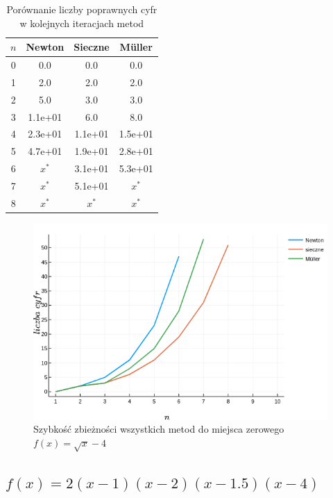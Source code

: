 \documentclass[12pt]{article}
\begin{document}
\begin{table}[H]
\centering
\begin{tabular}{|c|c|c|c|}
    \hline
    $n$ & Newton & Sieczne & Müller   \\ \hline\hline
    0  & 0.0     & 0.0     &  0.0     \\ \hline
    1  & 2.0     & 2.0     &  2.0     \\ \hline
    2  & 5.0     & 3.0     &  3.0     \\ \hline
    3  & 1.1e+01 & 6.0     &  8.0     \\ \hline
    4  & 2.3e+01 & 1.1e+01 &  1.5e+01 \\ \hline
    5  & 4.7e+01 & 1.9e+01 &  2.8e+01 \\ \hline
    6  & $x^*$   & 3.1e+01 &  5.3e+01 \\ \hline
    7  & $x^*$   & 5.1e+01 &  $x^*$   \\ \hline
    8  & $x^*$   & $x^*$   &  $x^*$   \\ \hline
\end{tabular}
\caption{Porównanie liczby poprawnych cyfr w kolejnych iteracjach metod}
\label{table:table2}
\end{table}
    
\begin{figure}[H]
    \centering
    \includegraphics[scale=0.7]{plot2.png}
\caption{Szybkość zbieżności wszystkich metod do miejsca 
            zerowego $f(x) = \sqrt{x} - 4$}
\label{figure:plot2}
\end{figure}

\subsection{$f(x) = 2(x-1)(x-2)(x-1.5)(x-4)$}
\end{document}
